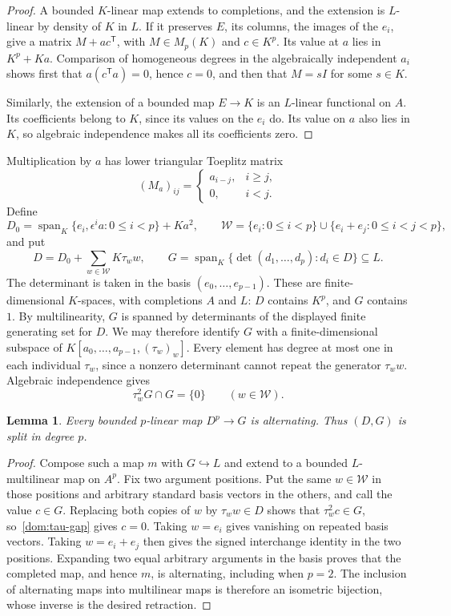 \documentclass[11pt]{amsart}
\newtheorem{lemma}[theorem]{Lemma}
\theoremstyle{definition}
\theoremstyle{remark}
\numberwithin{equation}{section}
\newcommand{\spn}{\operatorname{span}}
\begin{document}
\begin{proof}
A bounded $K$\nobreakdash-linear map extends to completions, and the extension is $L$\nobreakdash-linear
by density of $K$ in $L$. If it preserves $E$, its columns, the images of the $e_i$, give a matrix
$M+ac^{\mathsf T}$, with $M\in M_p(K)$ and $c\in K^p$. Its value at $a$ lies in $K^p+Ka$.
Comparison of homogeneous degrees in the algebraically independent $a_i$ shows first that
$a(c^{\mathsf T}a)=0$, hence $c=0$, and then that $M=sI$ for some $s\in K$.

Similarly, the extension of a bounded map $E\to K$ is an $L$\nobreakdash-linear functional on $A$.
Its coefficients belong to $K$, since its values on the $e_i$ do. Its value on $a$ also lies in $K$,
so algebraic independence makes all its coefficients zero.
\end{proof}

Multiplication by $a$ has lower triangular Toeplitz matrix
\[
(M_a)_{ij}=\begin{cases}a_{i-j},&i\ge j,\\0,&i<j.\end{cases}
\]
Define
\[
D_0=\spn_K\{e_i,\epsilon^i a:0\le i<p\}+Ka^2,
\qquad
\mathcal W=\{e_i:0\le i<p\}\cup\{e_i+e_j:0\le i<j<p\},
\]
and put
\[
D=D_0+\sum_{w\in\mathcal W}K\tau_w w,\qquad
G=\spn_K\{\det(d_1,\ldots,d_p):d_i\in D\}\subseteq L.
\]
The determinant is taken in the basis $(e_0,\ldots,e_{p-1})$. These are finite-dimensional
$K$\nobreakdash-spaces, with completions $A$ and $L$: $D$ contains $K^p$, and $G$ contains $1$.
By multilinearity, $G$ is spanned by determinants of the displayed finite generating set for $D$.
We may therefore identify $G$ with a finite-dimensional subspace of
$K[a_0,\ldots,a_{p-1},(\tau_w)_w]$. Every element has degree at most one in each individual $\tau_w$,
since a nonzero determinant cannot repeat the generator $\tau_w w$. Algebraic independence gives
\begin{equation}\label{dom:tau-gap}
\tau_w^2G\cap G=\{0\}\qquad(w\in\mathcal W).
\end{equation}

\begin{lemma}\label{dom:all-alt}
Every bounded $p$\nobreakdash-linear map $D^p\to G$ is alternating. Thus $(D,G)$ is split in degree $p$.
\end{lemma}

\begin{proof}
Compose such a map $m$ with $G\hookrightarrow L$ and extend to a bounded $L$\nobreakdash-multilinear map
on $A^p$. Fix two argument positions. Put the same $w\in\mathcal W$ in those positions and arbitrary
standard basis vectors in the others, and call the value $c\in G$. Replacing both copies of $w$ by
$\tau_w w\in D$ shows that $\tau_w^2c\in G$, so~\eqref{dom:tau-gap} gives $c=0$.
Taking $w=e_i$ gives vanishing on repeated basis vectors. Taking $w=e_i+e_j$ then gives the signed
interchange identity in the two positions. Expanding two equal arbitrary arguments in the basis proves
that the completed map, and hence $m$, is alternating, including when $p=2$. The inclusion of alternating
maps into multilinear maps is therefore an isometric bijection, whose inverse is the desired retraction.
\end{proof}
\end{document}
